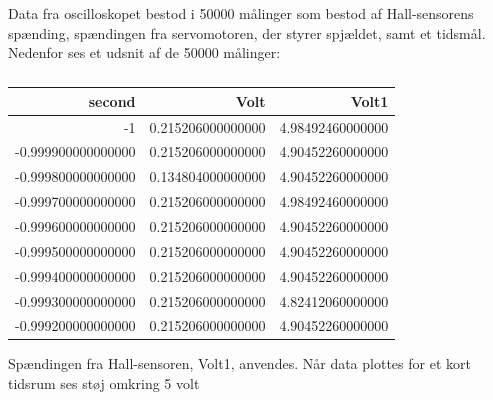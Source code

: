 Data fra oscilloskopet bestod i 50000 målinger som bestod af Hall-sensorens spænding, spændingen fra servomotoren, der styrer spjældet, samt et tidsmål. Nedenfor ses et udsnit af de 50000 målinger:

\begin{table}[h]
  \centering
\begin{tabular}{r|r|r}
\hline
\textbf{second} & \textbf{Volt} & \textbf{Volt1} \\
\hline
-1 & 0.215206000000000 & 4.98492460000000 \\
-0.999900000000000 & 0.215206000000000 & 4.90452260000000 \\
-0.999800000000000 & 0.134804000000000 & 4.90452260000000 \\
-0.999700000000000 & 0.215206000000000 & 4.98492460000000 \\
-0.999600000000000 & 0.215206000000000 & 4.90452260000000 \\
-0.999500000000000 & 0.215206000000000 & 4.90452260000000 \\
-0.999400000000000 & 0.215206000000000 & 4.90452260000000 \\
-0.999300000000000 & 0.215206000000000 & 4.82412060000000 \\
-0.999200000000000 & 0.215206000000000 & 4.90452260000000 \\
\hline
\end{tabular}
  \caption{}
  \label{tab:komp3}
\end{table}

Spændingen fra Hall-sensoren, Volt1, anvendes.
Når data plottes for et kort tidsrum ses støj omkring 5 volt

